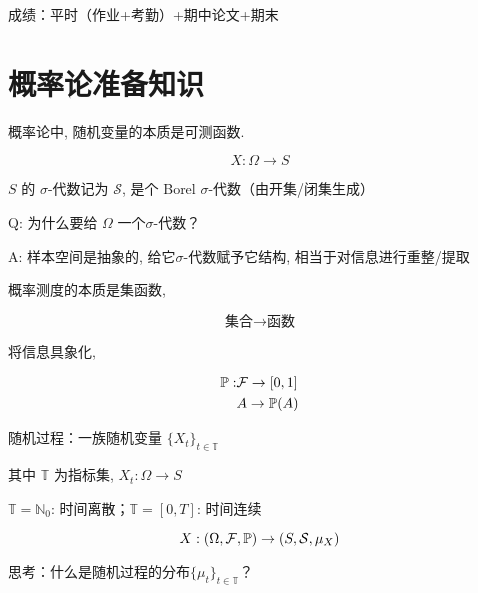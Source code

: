 成绩：平时（作业+考勤）+期中论文+期末

\section*{概率论准备知识}

概率论中, 随机变量的本质是可测函数. 

\[
X:\Omega\rightarrow S
\]

$S$ 的 $\sigma$-代数记为 $\mathcal{S}$, 是个 Borel $\sigma$-代数（由开集/闭集生成）

Q: 为什么要给 $\Omega$ 一个$\sigma$-代数？

A: 样本空间是抽象的, 给它$\sigma$-代数赋予它结构, 相当于对信息进行重整/提取

概率测度的本质是集函数, 

\[
\text{集合}\rightarrow \text{函数}
\]

将信息具象化, 

\[
\begin{aligned}
    \mathbb{P}: &\mathcal{F}\rightarrow [0,1]\\
    &A\rightarrow \mathbb{P}(A)
\end{aligned}
\]

随机过程：一族随机变量 $\{X_t\}_{t\in \mathbb{T}}$

其中 $\mathbb{T}$ 为指标集, $X_t:\Omega\rightarrow S$

\begin{example}
$\mathbb{T}=\mathbb{N}_0$: 时间离散；$\mathbb{T}=[0,T]$: 时间连续 
\end{example}

\[
X:(\Omega, \mathcal{F}, \mathbb{P})\rightarrow (S,\mathcal{S}, \mu_X)
\]

思考：什么是随机过程的分布$\{\mu_t\}_{t\in \mathbb{T}}$？

\newpage